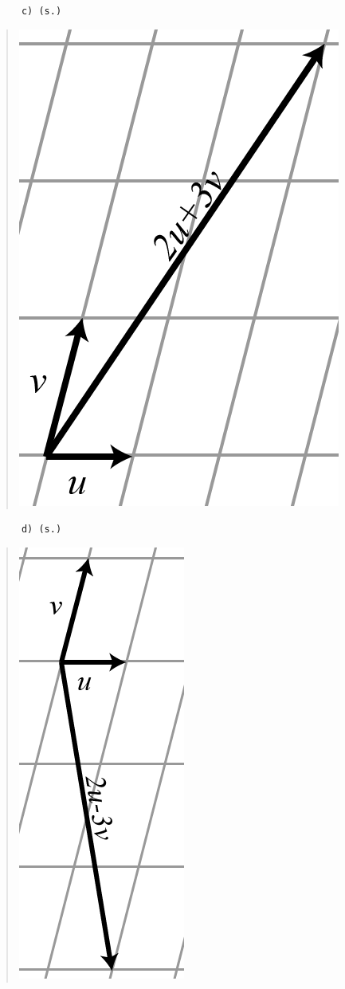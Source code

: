 \documentclass[a4paper]{article}
\newcommand{\tskcol}[1]{\textcolor{tskcol}{#1}}
\begin{document}
\texttt{\tskcol{~~~~~~c) (s.)}}
\begin{quotation}
	\noindent
	\includegraphics[scale=0.3]{images/21c.PNG}
\end{quotation}

\texttt{\tskcol{~~~~~~d) (s.)}}
\begin{quotation}
	\noindent
	\includegraphics[scale=0.3]{images/21d.PNG}
\end{quotation}
\end{document}
